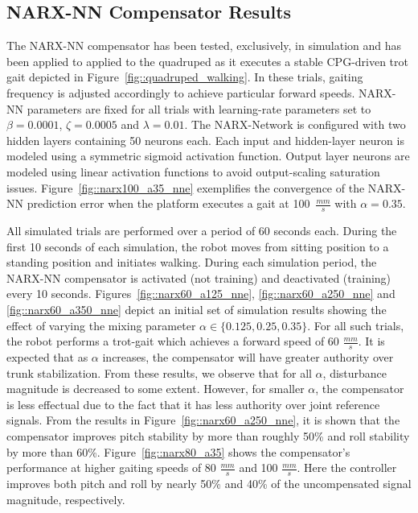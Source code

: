 		\subsection{NARX-NN Compensator Results}
			The NARX-NN compensator has been tested, exclusively, in simulation and has been applied to applied to the quadruped as it executes a stable CPG-driven trot gait depicted in Figure~\ref{fig::quadruped_walking}. In these trials, gaiting frequency is adjusted accordingly to achieve particular forward speeds. NARX-NN parameters are fixed for all trials with learning-rate  parameters set to $\beta=0.0001$, $\zeta=0.0005$ and $\lambda = 0.01$. The NARX-Network is configured with two hidden layers containing 50 neurons each. Each input and hidden-layer neuron is modeled using a symmetric sigmoid activation function. Output layer neurons are modeled using linear activation functions to  avoid output-scaling saturation issues. Figure~\ref{fig::narx100_a35_nne} exemplifies the convergence of the NARX-NN prediction error when the platform executes a gait at  100~$\frac{mm}{s}$ with $\alpha = 0.35$.

			All simulated trials are performed over a period of 60 seconds each. During the first 10 seconds of each simulation, the robot moves from sitting position to a standing position and initiates walking. During each simulation period, the NARX-NN compensator is activated (not training)  and deactivated (training)  every 10 seconds. Figures~\ref{fig::narx60_a125_nne}, \ref{fig::narx60_a250_nne} and \ref{fig::narx60_a350_nne} depict an initial set of simulation results showing the effect of varying  the mixing parameter $\alpha\in\{0.125, 0.25, 0.35\}$. For all such trials, the robot performs a trot-gait which achieves a forward speed of 60 $\frac{mm}{s}$. It is expected that as $\alpha$ increases, the compensator will have greater authority over trunk stabilization. From these results, we observe that for all $\alpha$, disturbance magnitude is decreased to some extent. However, for smaller $\alpha$, the compensator is less effectual due to the fact that it has less authority over joint reference signals.  From the results in Figure~\ref{fig::narx60_a250_nne}, it is shown that the compensator improves pitch stability by more than roughly 50\% and roll stability by more than 60\%. Figure~\ref{fig::narx80_a35} shows the compensator's performance at higher gaiting speeds of 80 $\frac{mm}{s}$ and 100 $\frac{mm}{s}$. Here the controller improves both pitch and roll by nearly 50\% and 40\% of the  uncompensated signal magnitude, respectively.

